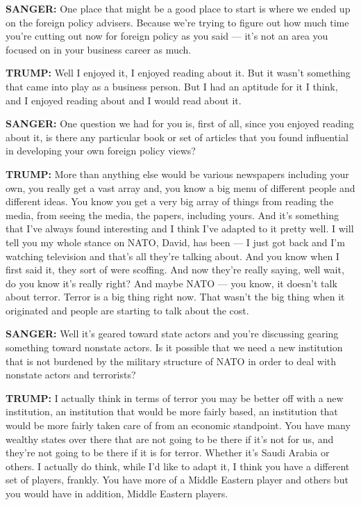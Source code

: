 \textbf{SANGER:} One place that might be a good place to start is where
we ended up on the foreign policy advisers. Because we're trying to
figure out how much time you're cutting out now for foreign policy as
you said --- it's not an area you focused on in your business career as
much.

\textbf{TRUMP:} Well I enjoyed it, I enjoyed reading about it. But it
wasn't something that came into play as a business person. But I had an
aptitude for it I think, and I enjoyed reading about and I would read
about it.

\textbf{SANGER:} One question we had for you is, first of all, since you
enjoyed reading about it, is there any particular book or set of
articles that you found influential in developing your own foreign
policy views?

\textbf{TRUMP:} More than anything else would be various newspapers
including your own, you really get a vast array and, you know a big menu
of different people and different ideas. You know you get a very big
array of things from reading the media, from seeing the media, the
papers, including yours. And it's something that I've always found
interesting and I think I've adapted to it pretty well. I will tell you
my whole stance on NATO, David, has been --- I just got back and I'm
watching television and that's all they're talking about. And you know
when I first said it, they sort of were scoffing. And now they're really
saying, well wait, do you know it's really right? And maybe NATO --- you
know, it doesn't talk about terror. Terror is a big thing right now.
That wasn't the big thing when it originated and people are starting to
talk about the cost.

\textbf{SANGER:} Well it's geared toward state actors and you're
discussing gearing something toward nonstate actors. Is it possible that
we need a new institution that is not burdened by the military structure
of NATO in order to deal with nonstate actors and terrorists?

\textbf{TRUMP:} I actually think in terms of terror you may be better
off with a new institution, an institution that would be more fairly
based, an institution that would be more fairly taken care of from an
economic standpoint. You have many wealthy states over there that are
not going to be there if it's not for us, and they're not going to be
there if it is for terror. Whether it's Saudi Arabia or others. I
actually do think, while I'd like to adapt it, I think you have a
different set of players, frankly. You have more of a Middle Eastern
player and others but you would have in addition, Middle Eastern
players.

